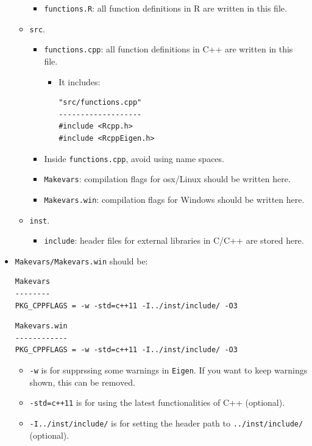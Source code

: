 \documentclass[]{book}
\providecommand{\tightlist}{%
  \setlength{\itemsep}{0pt}\setlength{\parskip}{0pt}}
\begin{document}
\begin{itemize}
\begin{itemize}
    \begin{itemize}
    \tightlist
    \item
      \texttt{functions.R}: all function definitions in R are written in
      this file.
    \end{itemize}
  \item
    \texttt{src}.

    \begin{itemize}
    \tightlist
    \item
      \texttt{functions.cpp}: all function definitions in C++ are
      written in this file.

      \begin{itemize}
      \item
        It includes:

\begin{verbatim}
"src/functions.cpp"
-------------------
#include <Rcpp.h>
#include <RcppEigen.h>
\end{verbatim}
      \end{itemize}
    \item
      Inside \texttt{functions.cpp}, avoid using name spaces.
    \item
      \texttt{Makevars}: compilation flags for osx/Linux should be
      written here.
    \item
      \texttt{Makevars.win}: compilation flags for Windows should be
      written here.
    \end{itemize}
  \item
    \texttt{inst}.

    \begin{itemize}
    \tightlist
    \item
      \texttt{include}: header files for external libraries in C/C++ are
      stored here.
    \end{itemize}
  \end{itemize}
\item
  \texttt{Makevars/Makevars.win} should be:

\begin{verbatim}
Makevars
--------
PKG_CPPFLAGS = -w -std=c++11 -I../inst/include/ -O3
\end{verbatim}

\begin{verbatim}
Makevars.win
------------
PKG_CPPFLAGS = -w -std=c++11 -I../inst/include/ -O3
\end{verbatim}

  \begin{itemize}
  \tightlist
  \item
    \texttt{-w} is for supprssing some warnings in \texttt{Eigen}. If
    you want to keep warnings shown, this can be removed.
  \item
    \texttt{-std=c++11} is for using the latest functionalities of C++
    (optional).
  \item
    \texttt{-I../inst/include/} is for setting the header path to
    \texttt{../inst/include/} (optional).
  \end{itemize}
\end{itemize}
\end{document}
